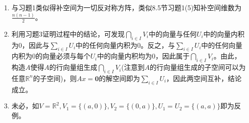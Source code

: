\documentclass[a4paper,UTF8,fontset=windows]{ctexart}
\begin{document}
\begin{enumerate}
\item
与习题1类似得补空间为一切反对称方阵，类似8.5节习题1(5)知补空间维数为$\frac{n(n-1)}{2}$。

\item
利用习题3证明过程中的结论，可发现$\bigcap_{i\in I}V_i$中的向量与任何$U_i$中的向量内积为0，因此与$\sum_{i\in I}U_i$中的任何向量内积为0。反之，与$\sum_{i\in I}U_i$中的任何向量内积为0的向量必须与每个$U_i$中的向量内积均为0，因此属于$\bigcap_{i\in I}V_i$。由此，构造$A$使得$A$的行向量组生成$\bigcap_{i\in I}V_i$(注意到$A$的行向量组生成的子空间可以为任意$\mathbb{R}^n$的子空间)，则$Ax=\mathbf{0}$的解空间即为$\sum_{i\in I}U_i$，因此两空间互补，结论成立。

\item
未必，如$V=\mathbb{R}^2,V_1=\{(a,0)\},V_2=\{(0,a)\},U_1=U_2=\{(a,a)\}$即为反例。
\end{enumerate}
\end{document}
